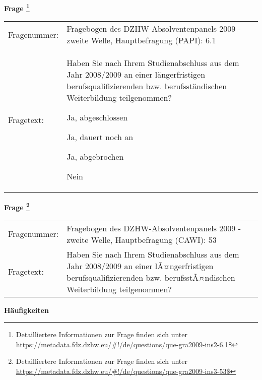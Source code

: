 				\vspace*{0.5cm}
                \noindent\textbf{Frage
	                \footnote{Detailliertere Informationen zur Frage finden sich unter
		              \url{https://metadata.fdz.dzhw.eu/\#!/de/questions/que-gra2009-ins2-6.1$}}}\\
				\begin{tabularx}{\hsize}{@{}lX}
					Fragenummer: &
					  Fragebogen des DZHW-Absolventenpanels 2009 - zweite Welle, Hauptbefragung (PAPI):
					  6.1
 \\
					Fragetext: & Haben Sie nach Ihrem Studienabschluss aus dem Jahr 2008/2009 an einer längerfristigen berufsqualifizierenden bzw. berufsständischen Weiterbildung teilgenommen?\par  Ja, abgeschlossen\par  Ja, dauert noch an\par  Ja, abgebrochen\par  Nein \\
				\end{tabularx}
				\vspace*{0.5cm}
                \noindent\textbf{Frage
	                \footnote{Detailliertere Informationen zur Frage finden sich unter
		              \url{https://metadata.fdz.dzhw.eu/\#!/de/questions/que-gra2009-ins3-53$}}}\\
				\begin{tabularx}{\hsize}{@{}lX}
					Fragenummer: &
					  Fragebogen des DZHW-Absolventenpanels 2009 - zweite Welle, Hauptbefragung (CAWI):
					  53
 \\
					Fragetext: & Haben Sie nach Ihrem Studienabschluss aus dem Jahr 2008/2009 an einer lÃ¤ngerfristigen berufsqualifizierenden bzw. berufsstÃ¤ndischen Weiterbildung teilgenommen? \\
				\end{tabularx}





        		\vspace*{0.5cm}
                \noindent\textbf{Häufigkeiten}

